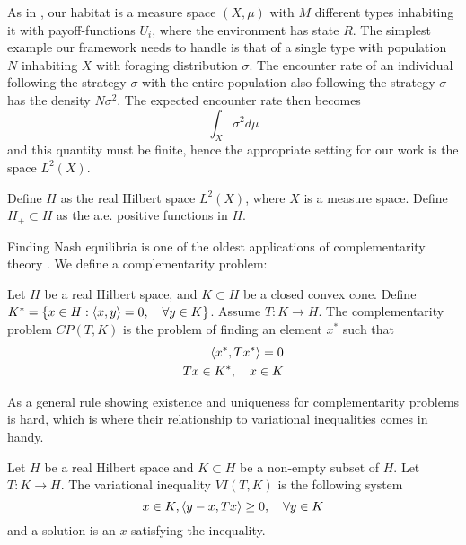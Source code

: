 As in , our habitat is a measure space $(X,\mu)$ with $M$ different types inhabiting it with payoff-functions $U_i$, where the environment has state $R$. The simplest example our framework needs to handle is that of a single type with population $N$ inhabiting $X$ with foraging distribution $\sigma$. The encounter rate of an individual following the strategy $\sigma$ with the entire population also following the strategy $\sigma$ has the density $N\sigma^2$. The expected encounter rate then becomes
\begin{equation}
  \int_X \sigma^2 d\mu
\end{equation}
and this quantity must be finite, hence the appropriate setting for our work is the space $L^2(X)$.
\begin{definition}
  Define $H$ as the real Hilbert space $L^2(X)$, where $X$ is a measure space. Define $H_+ \subset H$ as the a.e. positive functions in $H$.
\end{definition}
Finding Nash equilibria is one of the oldest applications of complementarity theory \citep{karamardian1969nonlinear}. We define a complementarity problem:
\begin{definition}
  Let $H$ be a real Hilbert space, and $K \subset H$ be a closed convex cone. Define $K^* = \{ x \in H : \left \langle x,y \right \rangle = 0, \quad \forall y\in K\} $. Assume $T:K \to H$. The complementarity problem $CP(T,K)$ is the problem of finding an element $x^*$ such that
  \begin{equation}
    \begin{split}
    \left \langle x^*,Tx^* \right \rangle = 0 \\
    Tx \in K^*, \quad  x\in K
  \end{split}
  \end{equation}
\end{definition}
As a general rule showing existence and uniqueness for complementarity problems is hard, which is where their relationship to variational inequalities comes in handy.
\begin{definition}
  Let $H$ be a real Hilbert space and $K\subset H$ be a non-empty subset of $H$. Let $T: K \to H$. The variational inequality $VI(T,K)$ is the following system
  \begin{equation}
    x \in K, \left \langle y-x,Tx \right \rangle \geq 0, \quad \forall y \in K
  \end{equation}
  and a solution is an $x$ satisfying the inequality.
\end{definition}

